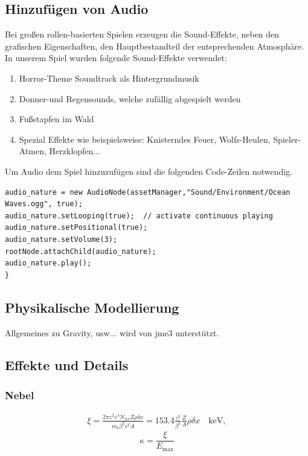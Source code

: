 \subsection{Hinzufügen von Audio}
Bei großen rollen-basierten Spielen erzeugen die Sound-Effekte, neben den grafischen Eigenschaften, den Hauptbestandteil der entsprechenden Atmosphäre. In unserem Spiel wurden folgende Sound-Effekte verwendet:
\begin{enumerate}
	\item Horror-Theme Soundtrack als Hintergrundmusik
	\item Donner-und Regensounds, welche zufällig abgespielt werden
	\item Fußstapfen im Wald
	\item Spezial Effekte wie beispielsweise: Knisterndes Feuer, Wolfs-Heulen, Spieler-Atmen, Herzklopfen...
\end{enumerate} Um Audio dem Spiel hinzuzufügen sind die folgenden Code-Zeilen notwendig.

\begin{lstlisting}
audio_nature = new AudioNode(assetManager,"Sound/Environment/Ocean Waves.ogg", true);
audio_nature.setLooping(true);  // activate continuous playing
audio_nature.setPositional(true);   
audio_nature.setVolume(3);
rootNode.attachChild(audio_nature);
audio_nature.play();
}
\end{lstlisting}


\subsection{Physikalische Modellierung}
Allgemeines zu Gravity, usw... wird von jme3 unterstützt.

\subsection{Effekte und Details}

\subsubsection{Nebel}
\begin{eqnarray*} \xi  = \frac{2\pi z^2 e^4 N_{\textrm{Av}} Z \rho
		\delta x}{m_{\textrm{e}} \beta^2 c^2 A} =  153.4 \frac{z^2}{\beta^2}
	\frac{Z}{A}
	\rho \delta x \quad\textrm{keV},
\end{eqnarray*}
\cite{Cr14}
\bigskip
\begin{equation}
\kappa =\frac{\xi}{E_{\textrm{max}}} %
\end{equation}


